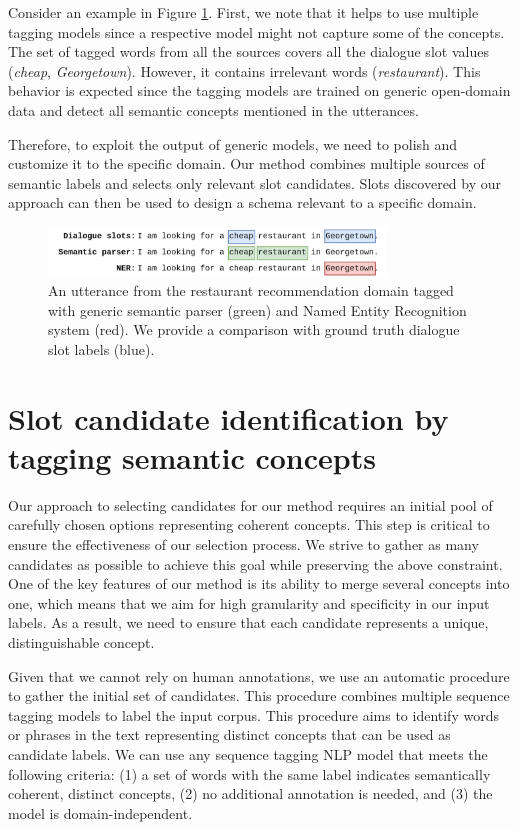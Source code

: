 Consider an example in Figure \ref{fig:tagged_example}.
First, we note that it helps to use multiple tagging models since a respective model might not capture some of the concepts.
The set of tagged words from all the sources covers all the dialogue slot values (\emph{cheap}, \emph{Georgetown}).
However, it contains irrelevant words (\emph{restaurant}).
This behavior is expected since the tagging models are trained on generic open-domain data and detect all semantic concepts mentioned in the utterances.

Therefore, to exploit the output of generic models, we need to polish and customize it to the specific domain.
Our method combines multiple sources of semantic labels and selects only relevant slot candidates.
Slots discovered by our approach can then be used to design a schema relevant to a specific domain.
\begin{figure}[h]
\centering
    \includegraphics[width=0.8\textwidth]{images/tagging-example.png}
    \caption{An utterance from the restaurant recommendation domain tagged with generic semantic parser (green) and Named Entity Recognition system (red). We provide a comparison with ground truth dialogue slot labels (blue).}
    \label{fig:tagged_example}
\end{figure}

\section{Slot candidate identification by tagging semantic concepts}
\label{04:sec:tagging_concepts}

Our approach to selecting candidates for our method requires an initial pool of carefully chosen options representing coherent concepts. This step is critical to ensure the effectiveness of our selection process. We strive to gather as many candidates as possible to achieve this goal while preserving the above constraint.
One of the key features of our method is its ability to merge several concepts into one, which means that we aim for high granularity and specificity in our input labels. As a result, we need to ensure that each candidate represents a unique, distinguishable concept.

Given that we cannot rely on human annotations, we use an automatic procedure to gather the initial set of candidates.
This procedure combines multiple sequence tagging models to label the input corpus.
This procedure aims to identify words or phrases in the text representing distinct concepts that can be used as candidate labels.
We can use any sequence tagging NLP model that meets the following criteria: (1) a set of words with the same label indicates semantically coherent, distinct concepts, (2) no additional annotation is needed, and (3) the model is domain-independent.

